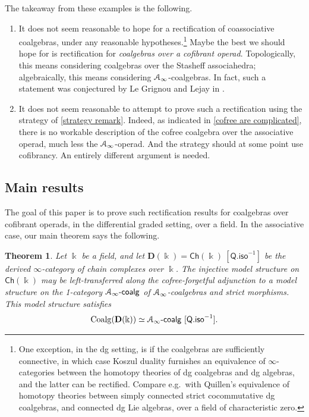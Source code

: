 \documentclass{proc-l}
\renewcommand{\mathcal}{\EuScript}
\newtheorem{theoremintro}{Theorem}
\newcommand{\onecoalg}[1]{#1\text{-}\mathsf{coalg}}
\theoremstyle{plain}
\theoremstyle{definition}
\theoremstyle{remark}
\newcommand{\kk}{\Bbbk}
\begin{document}
The takeaway from these examples is the following.
\begin{enumerate}
\item It does not seem reasonable to hope for a rectification of coassociative coalgebras, under any reasonable hypotheses.\footnote{One exception, in the dg setting, is if the coalgebras are sufficiently connective, in which case Koszul duality furnishes an equivalence of $\infty$-categories between the homotopy theories of dg coalgebras and dg algebras, and the latter can be rectified. Compare e.g.~with Quillen's \cite{quillen69} equivalence of homotopy theories between simply connected strict cocommutative dg coalgebras, and connected dg Lie algebras, over a field of characteristic zero.} Maybe the best we should hope for is rectification for \emph{coalgebras over a cofibrant operad}. Topologically, this means considering coalgebras over the Stasheff associahedra; algebraically, this means considering $\mathcal{A}_\infty$-coalgebras. In fact, such a statement was conjectured by Le Grignou and Lejay in \cite[Conjecture 8.3]{linearcoalgebras}.

\item It does not seem reasonable to attempt to prove such a rectification using the strategy of \cref{strategy remark}. Indeed, as indicated in \cref{cofree are complicated}, there is no workable description of the cofree coalgebra over the associative operad, much less the $\mathcal A_\infty$-operad. And the strategy should at some point use cofibrancy. An entirely different argument is needed.
\end{enumerate}

\subsection{Main results}%
\label{Section:1.3} The goal of this paper is to prove such rectification results for coalgebras over cofibrant operads, in the differential graded setting, over a field. In the associative case, our main theorem says the following.

\begin{theoremintro}%
\label{Theorem:A}\label{thm: main theorem associative case}
Let $\kk$ be a field, and let $\mathbf D(\kk) = \mathsf {Ch}(\kk)~[\mathsf{Q.iso}^{-1}]$ be the derived $\infty$-category of chain complexes over $\kk$. The injective model structure on $\mathsf {Ch}(\kk)$ may be left-transferred along the cofree-forgetful adjunction to a model structure on the 1-category $\onecoalg{\mathcal A_\infty}$ of $\mathcal A_\infty$-coalgebras and strict morphisms. This model structure satisfies
\[
\mathrm{Coalg}(\mathbf D(\kk)) \simeq \onecoalg{\mathcal A_\infty}~[\mathsf{Q.iso}^{-1}].
\]
\end{theoremintro}
\end{document}
